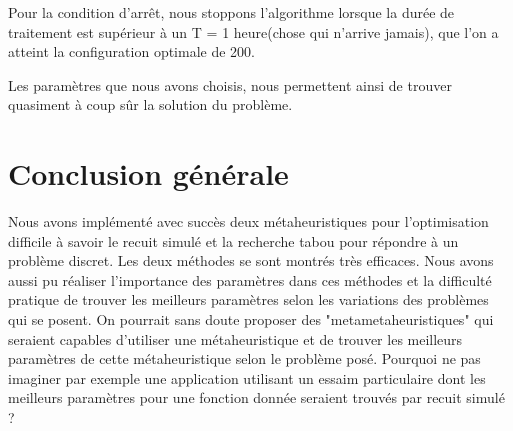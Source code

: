 \documentclass{report}
\begin{document}
Pour la condition d'arrêt, nous stoppons l'algorithme lorsque la durée de traitement est supérieur à un T = 1 heure(chose qui n'arrive jamais), que l'on a atteint la configuration optimale de 200.

Les paramètres que nous avons choisis, nous permettent ainsi de trouver quasiment à coup sûr la solution du problème.
\chapter{Conclusion générale}
Nous avons implémenté avec succès deux métaheuristiques pour l'optimisation difficile à savoir le recuit simulé et la recherche tabou pour répondre à un problème discret. Les deux méthodes se sont montrés très efficaces. Nous avons aussi pu réaliser l'importance des paramètres dans ces méthodes et la difficulté pratique de trouver les meilleurs paramètres selon les variations des problèmes qui se posent. On pourrait sans doute proposer des "metametaheuristiques" qui seraient capables d’utiliser une métaheuristique et de trouver
les meilleurs paramètres de cette métaheuristique selon le problème posé. Pourquoi
ne pas imaginer par exemple une application utilisant un essaim particulaire dont les
meilleurs paramètres pour une fonction donnée seraient trouvés par recuit simulé ?
\end{document}
